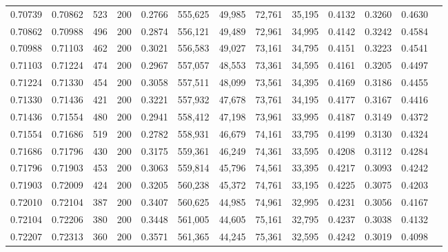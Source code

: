 \begin{tabular}{rrrrrrrrrrrrr}
0.70739 & 0.70862 &    523 & 200 &                                     0.2766 & 555,625 &  49,985 &  72,761 &  35,195 & 0.4132 & 0.3260 & 0.4630 \\
0.70862 & 0.70988 &    496 & 200 &                                     0.2874 & 556,121 &  49,489 &  72,961 &  34,995 & 0.4142 & 0.3242 & 0.4584 \\
0.70988 & 0.71103 &    462 & 200 &                                     0.3021 & 556,583 &  49,027 &  73,161 &  34,795 & 0.4151 & 0.3223 & 0.4541 \\
0.71103 & 0.71224 &    474 & 200 &                                     0.2967 & 557,057 &  48,553 &  73,361 &  34,595 & 0.4161 & 0.3205 & 0.4497 \\
0.71224 & 0.71330 &    454 & 200 &                                     0.3058 & 557,511 &  48,099 &  73,561 &  34,395 & 0.4169 & 0.3186 & 0.4455 \\
0.71330 & 0.71436 &    421 & 200 &                                     0.3221 & 557,932 &  47,678 &  73,761 &  34,195 & 0.4177 & 0.3167 & 0.4416 \\
0.71436 & 0.71554 &    480 & 200 &                                     0.2941 & 558,412 &  47,198 &  73,961 &  33,995 & 0.4187 & 0.3149 & 0.4372 \\
0.71554 & 0.71686 &    519 & 200 &                                     0.2782 & 558,931 &  46,679 &  74,161 &  33,795 & 0.4199 & 0.3130 & 0.4324 \\
0.71686 & 0.71796 &    430 & 200 &                                     0.3175 & 559,361 &  46,249 &  74,361 &  33,595 & 0.4208 & 0.3112 & 0.4284 \\
0.71796 & 0.71903 &    453 & 200 &                                     0.3063 & 559,814 &  45,796 &  74,561 &  33,395 & 0.4217 & 0.3093 & 0.4242 \\
0.71903 & 0.72009 &    424 & 200 &                                     0.3205 & 560,238 &  45,372 &  74,761 &  33,195 & 0.4225 & 0.3075 & 0.4203 \\
0.72010 & 0.72104 &    387 & 200 &                                     0.3407 & 560,625 &  44,985 &  74,961 &  32,995 & 0.4231 & 0.3056 & 0.4167 \\
0.72104 & 0.72206 &    380 & 200 &                                     0.3448 & 561,005 &  44,605 &  75,161 &  32,795 & 0.4237 & 0.3038 & 0.4132 \\
0.72207 & 0.72313 &    360 & 200 &                                     0.3571 & 561,365 &  44,245 &  75,361 &  32,595 & 0.4242 & 0.3019 & 0.4098 \\

\end{tabular}
